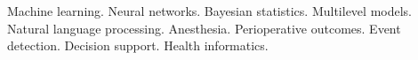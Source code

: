 

\begin{cvparagraph}

Machine learning. Neural networks. Bayesian statistics. Multilevel models. Natural language processing. Anesthesia. Perioperative outcomes. Event detection. Decision support. Health informatics.
\end{cvparagraph}